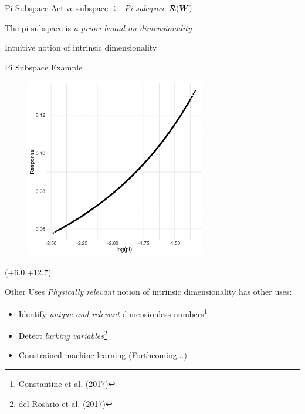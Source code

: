 \documentclass[14pt]{beamer}
\begin{document}
\begin{frame}{Pi Subspace}
  Active subspace $\subseteq$ \emph{Pi subspace} $\mathcal{R}(\boldsymbol{W})$

  \bigskip The pi subspace is \emph{a priori bound on dimensionality}

  \bigskip Intuitive notion of intrinsic dimensionality
\end{frame}

\begin{frame}{Pi Subspace Example}
  \begin{figure}
    \centering
    \includegraphics[width=0.7\textwidth]{../../images/as_summary_pi}
  \end{figure}

  \begin{textblock}{7}(+6.0,+12.7)
  \end{textblock}
\end{frame}

\begin{frame}{Other Uses}
  \emph{Physically relevant} notion of intrinsic dimensionality has other uses:

  \begin{itemize}
  \item Identify \emph{unique and relevant} dimensionless numbers\footnote{Constantine et al. (2017)}
  \item Detect \emph{lurking variables}\footnote{del Rosario et al. (2017)}
  \item Constrained machine learning (Forthcoming...)
  \end{itemize}
\end{frame}
\end{document}
